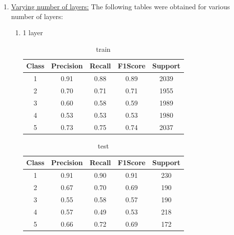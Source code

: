 \begin{enumerate}[label=(\alph*)]
          \newpage
    \item \underline{Varying number of layers:} The following tables were obtained for various number of layers:
          \begin{enumerate}[label=\roman*.]
              \item 1 layer
                    \begin{table}[!htb]
                        \centering
                        \begin{tabular}{ccccc}
                            \hline
                            Class & Precision & Recall & F1Score & Support \\ \hline
                            1     & 0.91      & 0.88   & 0.89    & 2039    \\
                            2     & 0.70      & 0.71   & 0.71    & 1955    \\
                            3     & 0.60      & 0.58   & 0.59    & 1989    \\
                            4     & 0.53      & 0.53   & 0.53    & 1980    \\
                            5     & 0.73      & 0.75   & 0.74    & 2037    \\ \hline
                        \end{tabular}
                        \caption{train}
                        \label{part c train depth 1}
                    \end{table}
                    \begin{table}[!htb]
                        \centering
                        \begin{tabular}{ccccc}
                            \hline
                            Class & Precision & Recall & F1Score & Support \\ \hline
                            1     & 0.91      & 0.90   & 0.91    & 230     \\
                            2     & 0.67      & 0.70   & 0.69    & 190     \\
                            3     & 0.55      & 0.58   & 0.57    & 190     \\
                            4     & 0.57      & 0.49   & 0.53    & 218     \\
                            5     & 0.66      & 0.72   & 0.69    & 172     \\ \hline
                        \end{tabular}
                        \caption{test}

\end{table}
\end{enumerate}
\end{enumerate}
